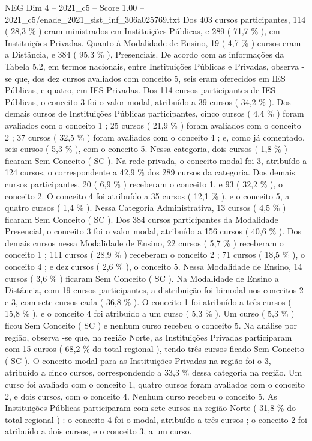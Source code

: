 \begin{textsample}{NEG Dim 4 – 2021\_c5 – Score 1.00 – 2021\_c5/enade\_2021\_sist\_inf\_306a025769.txt}
Dos 403 cursos participantes, 114 ( 28,3 \% ) eram ministrados em Instituições Públicas, e 289 ( 71,7 \% ), em Instituições Privadas.
Quanto à Modalidade de Ensino, 19 ( 4,7 \% ) cursos eram a Distância, e 384 ( 95,3 \% ), Presenciais.
De acordo com as informações da Tabela 5.2, em termos nacionais, entre Instituições Públicas e Privadas, observa -se que, dos dez cursos avaliados com conceito 5, seis eram oferecidos em IES Públicas, e quatro, em IES Privadas.
Dos 114 cursos participantes de IES Públicas, o conceito 3 foi o valor modal, atribuído a 39 cursos ( 34,2 \% ).
Dos demais cursos de Instituições Públicas participantes, cinco cursos ( 4,4 \% ) foram avaliados com o conceito 1 ; 25 cursos ( 21,9 \% ) foram avaliados com o conceito 2 ; 37 cursos ( 32,5 \% ) foram avaliados com o conceito 4 ; e, como já comentado, seis cursos ( 5,3 \% ), com o conceito 5.
Nessa categoria, dois cursos ( 1,8 \% ) ficaram Sem Conceito ( SC ).
Na rede privada, o conceito modal foi 3, atribuído a 124 cursos, o correspondente a 42,9 \% dos 289 cursos da categoria.
Dos demais cursos participantes, 20 ( 6,9 \% ) receberam o conceito 1, e 93 ( 32,2 \% ), o conceito 2.
O conceito 4 foi atribuído a 35 cursos ( 12,1 \% ), e o conceito 5, a quatro cursos ( 1,4 \% ).
Nessa Categoria Administrativa, 13 cursos ( 4,5 \% ) ficaram Sem Conceito ( SC ).
Dos 384 cursos participantes da Modalidade Presencial, o conceito 3 foi o valor modal, atribuído a 156 cursos ( 40,6 \% ).
Dos demais cursos nessa Modalidade de Ensino, 22 cursos ( 5,7 \% ) receberam o conceito 1 ; 111 cursos ( 28,9 \% ) receberam o conceito 2 ; 71 cursos ( 18,5 \% ), o conceito 4 ; e dez cursos ( 2,6 \% ), o conceito 5.
Nessa Modalidade de Ensino, 14 cursos ( 3,6 \% ) ficaram Sem Conceito ( SC ).
Na Modalidade de Ensino a Distância, com 19 cursos participantes, a distribuição foi bimodal nos conceitos 2 e 3, com sete cursos cada ( 36,8 \% ).
O conceito 1 foi atribuído a três cursos ( 15,8 \% ), e o conceito 4 foi atribuído a um curso ( 5,3 \% ).
Um curso ( 5,3 \% ) ficou Sem Conceito ( SC ) e nenhum curso recebeu o conceito 5.
Na análise por região, observa -se que, na região Norte, as Instituições Privadas participaram com 15 cursos ( 68,2 \% do total regional ), tendo três cursos ficado Sem Conceito ( SC ).
O conceito modal para as Instituições Privadas na região foi o 3, atribuído a cinco cursos, correspondendo a 33,3 \% dessa categoria na região.
Um curso foi avaliado com o conceito 1, quatro cursos foram avaliados com o conceito 2, e dois cursos, com o conceito 4.
Nenhum curso recebeu o conceito 5.
As Instituições Públicas participaram com sete cursos na região Norte ( 31,8 \% do total regional ) : o conceito 4 foi o modal, atribuído a três cursos ; o conceito 2 foi atribuído a dois cursos, e o conceito 3, a um curso.

\end{textsample}
